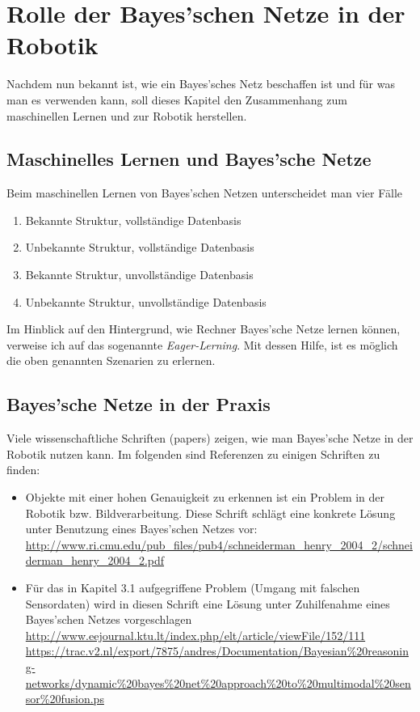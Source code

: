 \chapter{Rolle der Bayes'schen Netze in der Robotik}
Nachdem nun bekannt ist, wie ein Bayes'sches Netz beschaffen ist und für was man es verwenden kann, soll dieses Kapitel den Zusammenhang zum maschinellen Lernen und zur Robotik herstellen.
\section{Maschinelles Lernen und Bayes'sche Netze}
Beim maschinellen Lernen von Bayes'schen Netzen unterscheidet man vier Fälle \cite{Friedman}
\begin{enumerate}

\item Bekannte Struktur, vollständige Datenbasis
\item Unbekannte Struktur, vollständige Datenbasis
\item Bekannte Struktur, unvollständige Datenbasis 
\item Unbekannte Struktur, unvollständige Datenbasis
\end{enumerate}

Im Hinblick auf den Hintergrund, wie Rechner Bayes'sche Netze lernen können, verweise ich auf das sogenannte \textit{Eager-Lerning}. Mit dessen Hilfe, ist es möglich die oben genannten Szenarien zu erlernen. 

\section{Bayes'sche Netze in der Praxis}
Viele wissenschaftliche Schriften (papers) zeigen, wie man Bayes'sche Netze in der Robotik nutzen kann. Im folgenden sind Referenzen zu einigen Schriften zu finden:
\begin{itemize}
\item Objekte mit einer hohen Genauigkeit zu erkennen ist ein Problem in der Robotik bzw. Bildverarbeitung. Diese Schrift schlägt eine konkrete Lösung unter Benutzung eines Bayes'schen Netzes vor: \url{http://www.ri.cmu.edu/pub_files/pub4/schneiderman_henry_2004_2/schneiderman_henry_2004_2.pdf}
\item Für das in Kapitel 3.1 aufgegriffene Problem (Umgang mit falschen Sensordaten) wird in diesen Schrift eine Lösung unter Zuhilfenahme eines Bayes'schen Netzes vorgeschlagen \subitem \url{http://www.eejournal.ktu.lt/index.php/elt/article/viewFile/152/111} 
\subitem \url{https://trac.v2.nl/export/7875/andres/Documentation/Bayesian%20reasoning-networks/dynamic%20bayes%20net%20approach%20to%20multimodal%20sensor%20fusion.ps}
\end{itemize}






